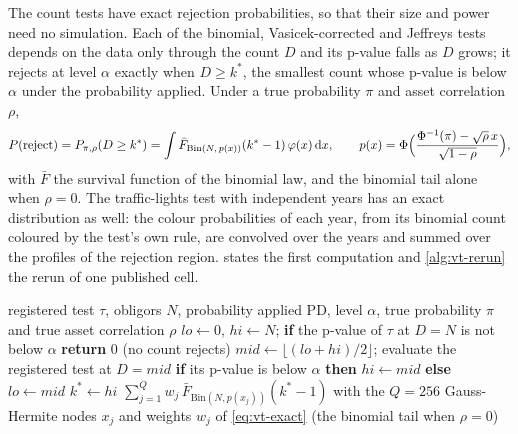 The count tests have exact rejection probabilities, so that their size and power need no simulation. Each of the binomial, Vasicek-corrected and Jeffreys tests depends on the data only through the count $D$ and its p-value falls as $D$ grows; it rejects at level $\alpha$ exactly when $D\ge k^{*}$, the smallest count whose p-value is below $\alpha$ under the probability applied. Under a true probability $\pi$ and asset correlation $\rho$,
\begin{equation}
  P(\text{reject})=P_{\pi,\rho}(D\ge k^{*})=\int\bar F_{\mathrm{Bin}(N,\,p(x))}(k^{*}-1)\,\varphi(x)\,\mathrm{d}x,\qquad p(x)=\Phi\Bigl(\frac{\Phi^{-1}(\pi)-\sqrt{\rho}\,x}{\sqrt{1-\rho}}\Bigr),
  \label{eq:vt-exact}
\end{equation}
with $\bar F$ the survival function of the binomial law, and the binomial tail alone when $\rho=0$. The traffic-lights test with independent years has an exact distribution as well: the colour probabilities of each year, from its binomial count coloured by the test's own rule, are convolved over the years and summed over the profiles of the rejection region.  states the first computation and \cref{alg:vt-rerun} the rerun of
one published cell.

\begin{algorithm}[htbp]
\caption{Exact rejection probability of a count test.}
\label{alg:vt-exact}
\begin{algorithmic}[1]
\Require registered test $\tau$, obligors $N$, probability applied $\mathrm{PD}$, level $\alpha$, true probability $\pi$ and true asset correlation $\rho$
\State $lo\gets0$, $hi\gets N$; \textbf{if} the p-value of $\tau$ at $D=N$ is not below $\alpha$ \textbf{return} 0 (no count rejects)
  \State $mid\gets\lfloor(lo+hi)/2\rfloor$; evaluate the registered test at $D=mid$
  \State \textbf{if} its p-value is below $\alpha$ \textbf{then} $hi\gets mid$ \textbf{else} $lo\gets mid$
\EndWhile
\State $k^{*}\gets hi$
\State \Return $\sum_{j=1}^{Q}w_j\,\bar F_{\mathrm{Bin}(N,p(x_j))}(k^{*}-1)$ with the $Q=256$ Gauss-Hermite nodes $x_j$ and weights $w_j$ of \cref{eq:vt-exact} (the binomial tail when $\rho=0$)
\end{algorithmic}
\end{algorithm}

